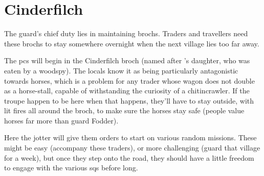 \section{Cinderfilch }



\begin{multicols}{2}

\noindent
The \gls{guard}'s chief duty lies in maintaining \glspl{broch}.
Traders and travellers need these \glspl{broch} to stay somewhere overnight when the next \gls{village} lies too far away.

The \glspl{pc} will begin in the Cinderfilch \gls{broch} (named after 's daughter, who was eaten by a woodspy).
The locals know it as being particularly antagonistic towards horses, which is a problem for any trader whose wagon does not double as a horse-stall, capable of withstanding the curiosity of a chitincrawler.
If the troupe happen to be here when that happens, they'll have to stay outside, with lit fires all around the \gls{broch}, to make sure the horses stay safe (people value horses far more than \gls{guard} Fodder).

Here the \gls{jotter} will give them orders to start on various random missions.%
These might be easy (accompany these traders), or more challenging (guard that \gls{village} for a week), but once they step onto the road, they should have a little freedom to engage with the various \glspl{sq} before long.

\end{multicols}
